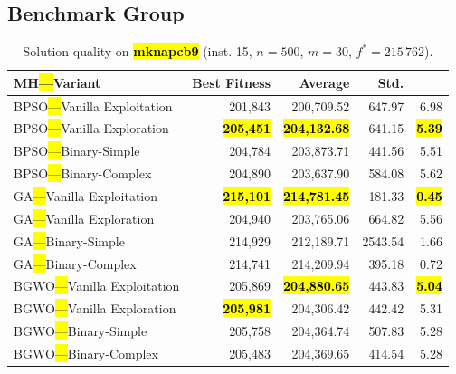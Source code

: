 \documentclass[mathematics,article,accept,moreauthors]{Definitions/mdpi}
\begin{document}
\subsection{Benchmark Group }

\vspace{-9pt}

\begin{table}[H]
  \small
  \caption{Solution quality on \textbf{\hl{mknapcb9}} (inst. 15, $n=500$, $m=30$, $f^*=215\,762$).}
  \label{tab:calidad_mknapcb9_15}
  \begin{tabularx}{\textwidth}{lRRRR}
    \toprule
    \textbf{MH\hl{---}Variant} &
    \textbf{Best Fitness} &
    \textbf{Average} &
    \textbf{Std.} &
    \textbf{} \\
    \midrule
    BPSO\hl{---}Vanilla Exploitation &         201,843 &        200,709.52 & 647.97 &         6.98 \\
    BPSO\hl{---}Vanilla Exploration  & \textbf{\hl{205,451}} & \textbf{\hl{204,132.68}} & 641.15 & \textbf{\hl{5.39}} \\
    BPSO\hl{---}Binary-Simple        &         204,784 &        203,873.71 & 441.56 &         5.51 \\
    BPSO\hl{---}Binary-Complex       &         204,890 &        203,637.90 & 584.08 &         5.62 \\
    \midrule
    GA\hl{---}Vanilla Exploitation   & \textbf{\hl{215,101}} & \textbf{\hl{214,781.45}} & 181.33 & \textbf{\hl{0.45}} \\
    GA\hl{---}Vanilla Exploration    &         204,940 &        203,765.06 & 664.82 &         5.56 \\
    GA\hl{---}Binary-Simple          &         214,929 &        212,189.71 & 2543.54 &         1.66 \\
    GA\hl{---}Binary-Complex         &         214,741 &        214,209.94 & 395.18 &         0.72 \\
    \midrule
    BGWO\hl{---}Vanilla Exploitation &         205,869 & \textbf{\hl{204,880.65}} & 443.83 & \textbf{\hl{5.04}} \\
    BGWO\hl{---}Vanilla Exploration  & \textbf{\hl{205,981}} &        204,306.42 & 442.42 &         5.31 \\
    BGWO\hl{---}Binary-Simple        &         205,758 &        204,364.74 & 507.83 &         5.28 \\
    BGWO\hl{---}Binary-Complex       &         205,483 &        204,369.65 & 414.54 &         5.28 \\

\end{tabularx}
\end{table}
\end{document}
